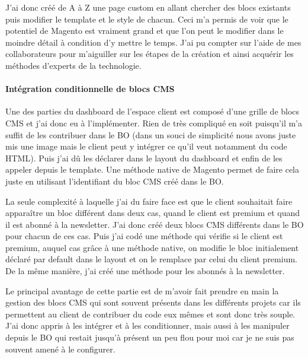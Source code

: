 \documentclass[a4paper,11pt,twoside]{report}
\begin{document}
    	J'ai donc créé de A à Z une page custom en allant chercher des blocs existants puis modifier le template et le style de chacun. Ceci m'a permis de voir que le potentiel de Magento est vraiment grand et que l'on peut le modifier dans le moindre détail à condition d'y mettre le temps. J'ai pu compter sur l'aide de mes collaborateurs pour m'aiguiller sur les étapes de la création et ainsi acquérir les méthodes d'experts de la technologie.
    	\paragraph*{Intégration conditionnelle de blocs CMS}
    	Une des parties du dashboard de l'espace client est composé d'une grille de blocs CMS et j'ai donc eu à l'implémenter. Rien de très compliqué en soit puisqu'il m'a suffit de les contribuer dans le BO (dans un souci de simplicité nous avons juste mis une image mais le client peut y intégrer ce qu'il veut notamment du code HTML). Puis j'ai dû les déclarer dans le layout du dashboard et enfin de les appeler depuis le template. Une méthode native de Magento permet de faire cela juste en utilisant l'identifiant du bloc CMS créé dans le BO. 
	
	\label{SL_layout_custom_loyalty}
	
	
	La seule complexité à laquelle j'ai du faire face est que le client souhaitait faire apparaître un bloc différent dans deux cas, quand le client est premium et quand il est abonné à la newsletter. J'ai donc créé deux blocs CMS différents dans le BO pour chacun de ces cas. Puis j'ai codé une méthode qui vérifie si le client est premium, auquel cas grâce à une méthode native, on modifie le bloc initialement déclaré par default dans le layout et on le remplace par celui du client premium. De la même manière, j'ai créé une méthode pour les abonnés à la newsletter.
	\newline
	\label{SL_block_CMS_call_in_template}
	
	
	Le principal avantage de cette partie est de m'avoir fait prendre en main la gestion des blocs CMS qui sont souvent présents dans les différents projets car ils permettent au client de contribuer du code eux mêmes et sont donc très souple. J'ai donc appris à les intégrer et à les conditionner, mais aussi à les manipuler depuis le BO qui restait jusqu'à présent un peu flou pour moi car je ne suis pas souvent amené à le configurer.
	
\end{document}
